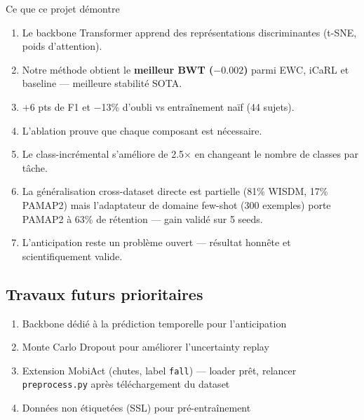 \documentclass[12pt, a4paper]{article}
\begin{document}
\begin{boiteverte}{Ce que ce projet démontre}
\begin{enumerate}
  \item Le backbone Transformer apprend des représentations discriminantes
        (t-SNE, poids d'attention).
  \item Notre méthode obtient le \textbf{meilleur BWT ($-0.002$)} parmi
        EWC, iCaRL et baseline --- meilleure stabilité SOTA.
  \item $+$6 pts de F1 et $-$13\% d'oubli vs entraînement naïf (44 sujets).
  \item L'ablation prouve que chaque composant est nécessaire.
  \item Le class-incrémental s'améliore de 2.5$\times$ en changeant
        le nombre de classes par tâche.
  \item La généralisation cross-dataset directe est partielle (81\% WISDM,
        17\% PAMAP2) mais l'adaptateur de domaine few-shot (300 exemples)
        porte PAMAP2 à 63\% de rétention --- gain validé sur 5 seeds.
  \item L'anticipation reste un problème ouvert --- résultat honnête
        et scientifiquement valide.
\end{enumerate}
\end{boiteverte}

\subsection*{Travaux futurs prioritaires}
\begin{enumerate}
  \item Backbone dédié à la prédiction temporelle pour l'anticipation
  \item Monte Carlo Dropout pour améliorer l'uncertainty replay
  \item Extension MobiAct (chutes, label \texttt{fall}) --- loader prêt,
        relancer \texttt{preprocess.py} après téléchargement du dataset
  \item Données non étiquetées (SSL) pour pré-entraînement
\end{enumerate}
\end{document}
